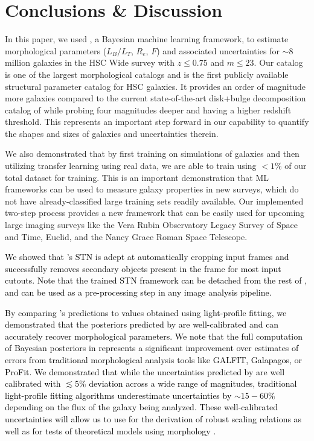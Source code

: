\section{Conclusions \& Discussion} \label{sec_c3:conclusions}
In this paper, we used \gampen{}, a Bayesian machine learning framework, to estimate morphological parameters ($L_B/L_T$, $R_e$, $F$) and associated uncertainties for $\sim8$ million galaxies in the HSC Wide survey with $z \leq 0.75$ and $m \leq 23$. Our catalog is one of the largest morphological catalogs and is the first publicly available structural parameter catalog for HSC galaxies. It provides an order of magnitude more galaxies compared to the current state-of-the-art disk+bulge decomposition catalog of \citet{simard_11} while probing four magnitudes deeper and having a higher redshift threshold. This represents an important step forward in our capability to quantify the shapes and sizes of galaxies and uncertainties therein.

We also demonstrated that by first training on simulations of galaxies and then utilizing transfer learning using real data, we are able to train \gampen{} using $<1\%$ of our total dataset for training. This is an important demonstration that ML frameworks can be used to measure galaxy properties in new surveys, which do not have already-classified large training sets readily available. Our implemented two-step process provides a new framework that can be easily used for upcoming large imaging surveys like the Vera Rubin Observatory Legacy Survey of Space and Time, Euclid, and the Nancy Grace Roman Space Telescope. 

\textcolor{black}{We showed that \gampen{}'s STN is adept at automatically cropping input frames and successfully removes secondary objects present in the frame for most input cutouts. Note that the trained STN framework can be detached from the rest of \gampen{}, and can be used as a pre-processing step in any image analysis pipeline.}

\textcolor{black}{By comparing \gampen{}'s predictions to values obtained using light-profile fitting, we demonstrated that the posteriors predicted by \gampen{} are well-calibrated and \gampen{} can accurately recover morphological parameters. We note that the full computation of Bayesian posteriors in \gampen{} represents a significant improvement over estimates of errors from traditional morphological analysis tools like GALFIT, Galapagos, or ProFit. We demonstrated that while the uncertainties predicted by \gampen{} are well calibrated with $\lesssim5\%$ deviation across a wide range of magnitudes, traditional light-profile fitting algorithms underestimate uncertainties by $\sim15-60\%$ depending on the flux of the galaxy being analyzed. These well-calibrated uncertainties will allow us to use \gampen{} for the derivation of robust scaling relations  \citep[e.g.,][]{Bernardi2013TheProfile, vanderWel20143D-HST+CANDELS:3} as well as for tests of theoretical models using morphology \citep[e.g.,][]{Schawinski2014TheGalaxies}.}


